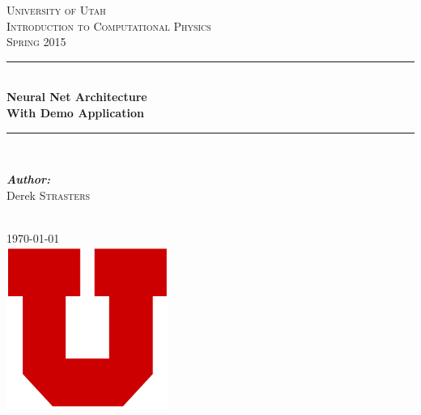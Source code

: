 \documentclass[a4paper,10pt]{article}
\let\oldemph\emph
\renewcommand{\emph}[1]{\textbf{\oldemph{#1}}}
\begin{document}

\begin{titlepage}

\newcommand{\HRule}{\rule{\linewidth}{0.5mm}} %

\center

\textsc{\LARGE University of Utah}\\[1.5cm]
\textsc{\Large Introduction to Computational Physics }\\[0.5cm]
\textsc{\large Spring 2015}\\[0.5cm]

\HRule \\[0.4cm]
{ \huge \bfseries Neural Net Architecture}\\[0.4cm]
{ \huge \bfseries With Demo Application}\\[0.1cm]
\HRule \\[1.cm]

\begin{minipage}{\textwidth}
\begin{flushleft} \large
\emph{Author:}\\  
Derek \textsc{Strasters}
\end{flushleft}
\end{minipage}
\\[3cm]

{\large \today}\\[4.0cm]

\includegraphics[scale=00.55]{images/Logo.png}\\

\vfill

\end{titlepage} 

\end{document}
